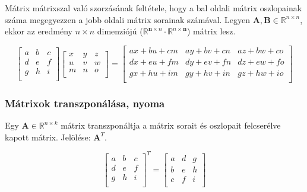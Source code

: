 \documentclass{article}
\begin{document}
\vspace{1cm}

Mátrix mátrixszal való szorzásának feltétele, hogy a bal oldali mátrix osz\-lopainak száma megegyezzen a jobb oldali mátrix sorainak számával.
Legyen $\mathbf{A}, \mathbf{B} \in \mathbb{R}^{n \times n}$, ekkor az eredmény $n \times n$ dimenziójú ($\mathbb{R}^{\mathbf{n} \times n} \cdot \mathbb{R}^{n \times \mathbf{n}}$) mátrix lesz.

\begin{equation*}
    \begin{bmatrix}
        a & b & c \\
        d & e & f \\
        g & h & i \\
    \end{bmatrix}
    \begin{bmatrix}
        x & y & z \\
        u & v & w \\
        m & n & o \\
    \end{bmatrix}
    =
    \begin{bmatrix}
        ax + bu + cm & ay + bv + cn & az + bw + co \\
        dx + eu + fm & dy + ev + fn & dz + ew + fo \\
        gx + hu + im & gy + hv + in & gz + hw + io \\
    \end{bmatrix}
\end{equation*}

\subsubsection{Mátrixok transzponálása, nyoma} 

Egy $\mathbf{A} \in \mathbb{R}^{n \times k}$ mátrix transzponáltja a mátrix sorait és oszlopait felcserélve kapott mátrix. Jelölése: $\mathbf{A}^T$.

\begin{equation*}
    \begin{bmatrix}
        a & b & c \\
        d & e & f \\
        g & h & i \\
    \end{bmatrix}^T
    =
    \begin{bmatrix}
        a & d & g \\
        b & e & h \\
        c & f & i \\
    \end{bmatrix}
\end{equation*}
\end{document}
